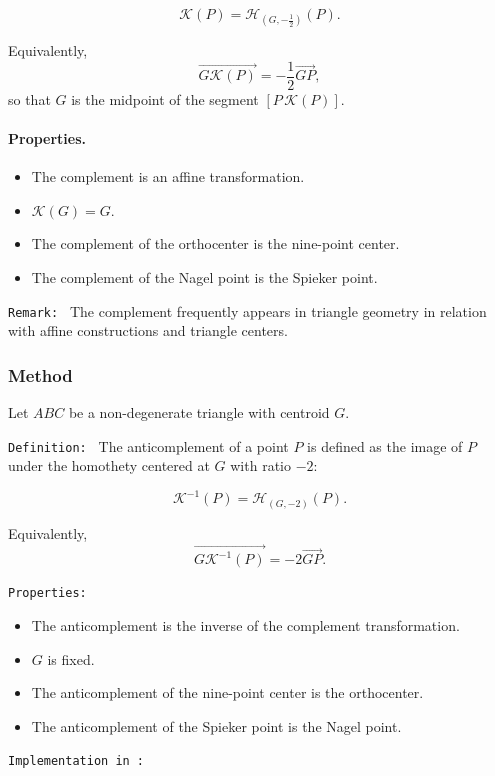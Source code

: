 \[
\mathcal{K}(P)=\mathcal{H}_{(G,-\frac{1}{2})}(P).
\]

Equivalently,
\[
\overrightarrow{G\mathcal{K}(P)}=-\dfrac{1}{2}\overrightarrow{GP},
\]
so that $G$ is the midpoint of the segment $[P\,\mathcal{K}(P)]$.

\paragraph{Properties.}
\begin{itemize}
\item The complement is an affine transformation.
\item $\mathcal{K}(G)=G$.
\item The complement of the orthocenter is the nine-point center.
\item The complement of the Nagel point is the Spieker point.
\end{itemize}


\texttt{Remark: }
The complement frequently appears in triangle geometry in relation with affine constructions and triangle centers.

\subsubsection{Method }
\label{ssub:anticomplement}

Let $ABC$ be a non-degenerate triangle with centroid $G$.

\texttt{Definition: }
The anticomplement of a point $P$ is defined as the image of $P$ under the homothety centered at $G$ with ratio $-2$:

\[
\mathcal{K}^{-1}(P)=\mathcal{H}_{(G,-2)}(P).
\]

Equivalently,
\[
\overrightarrow{G\mathcal{K}^{-1}(P)}=-2\overrightarrow{GP}.
\]

\texttt{Properties: }
\begin{itemize}
\item The anticomplement is the inverse of the complement transformation.
\item $G$ is fixed.
\item The anticomplement of the nine-point center is the orthocenter.
\item The anticomplement of the Spieker point is the Nagel point.
\end{itemize}

\texttt{Implementation in : }


